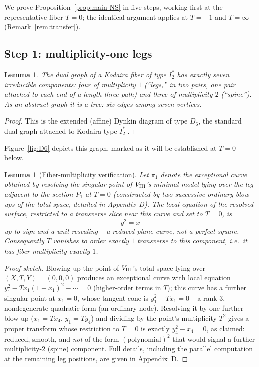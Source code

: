\documentclass[11pt]{amsart}
\newtheorem{lemma}[theorem]{Lemma}
\theoremstyle{definition}
\begin{document}
We prove Proposition~\ref{prop:main-NS} in five steps, working first at
the representative fiber $T=0$; the identical argument applies at $T=-1$
and $T=\infty$ (Remark~\ref{rem:transfer}).

\subsection*{Step 1: multiplicity-one legs}

\begin{lemma}
\label{lem:dual-graph}
The dual graph of a Kodaira fiber of type $I_2^*$ has exactly seven
irreducible components: four of multiplicity $1$ (``legs,'' in two
pairs, one pair attached to each end of a length-three path) and three of
multiplicity $2$ (``spine''). As an abstract graph it is a tree: six
edges among seven vertices.
\end{lemma}

\begin{proof}
This is the extended (affine) Dynkin diagram of type $D_6$, the standard
dual graph attached to Kodaira type $I_2^*$ \cite{Kodaira1963,
Neron1964, Tate1975}.
\end{proof}

Figure~\ref{fig:D6} depicts this graph, marked as it will be established
at $T=0$ below.

\begin{lemma}[Fiber-multiplicity verification]
\label{lem:mult-one}
Let $\pi_1$ denote the exceptional curve obtained by resolving the
singular point of $V_{\rm III}$'s minimal model lying over the leg
adjacent to the section $P_1$ at $T=0$ (constructed by two successive
ordinary blow-ups of the total space, detailed in
Appendix~D). The local equation of the resolved surface, restricted to a
transverse slice near this curve and set to $T=0$, is
\[
y^2 = x
\]
up to sign and a unit rescaling -- a \emph{reduced} plane curve, not a
perfect square. Consequently $T$ vanishes to order exactly $1$ transverse
to this component, i.e.\ it has fiber-multiplicity exactly $1$.
\end{lemma}

\begin{proof}[Proof sketch]
Blowing up the point of $V_{\rm III}$'s total space lying over $(X,T,Y)=(0,0,0)$
produces an exceptional curve with local equation $y_1^2-Tx_1(1+x_1)^2-\cdots=0$
(higher-order terms in $T$); this curve has a further singular point at
$x_1=0$, whose tangent cone is $y_1^2-Tx_1=0$ -- a rank-$3$, nondegenerate
quadratic form (an ordinary node). Resolving it by one further blow-up
($x_1=Tx_4$, $y_1=Ty_4$) and dividing by the point's multiplicity $T^2$
gives a proper transform whose restriction to $T=0$ is exactly $y_4^2-x_4=0$,
as claimed: reduced, smooth, and \emph{not} of the form $(\text{polynomial})^2$
that would signal a further multiplicity-$2$ (spine) component. Full
details, including the parallel computation at the remaining leg
positions, are given in Appendix~D.
\end{proof}
\end{document}
